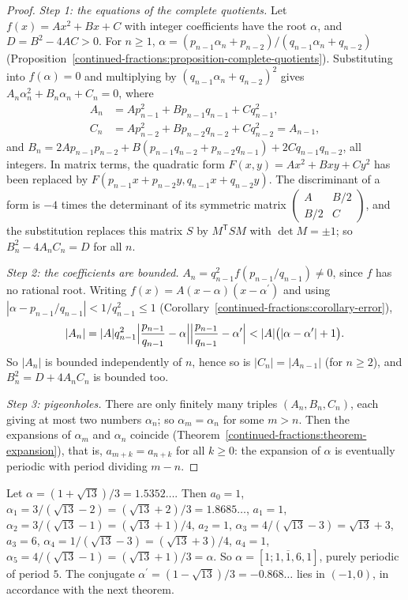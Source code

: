 \begin{proof}
\emph{Step 1: the equations of the complete quotients.} Let $f(x) = Ax^2 + Bx + C$ with integer coefficients have the root $\alpha$, and $D = B^2 - 4AC > 0$. For $n \geq 1$,
$\alpha = (p_{n-1}\alpha_n + p_{n-2})/(q_{n-1}\alpha_n + q_{n-2})$ (Proposition~\ref{continued-fractions:proposition-complete-quotients}). Substituting into $f(\alpha) = 0$ and multiplying by
$(q_{n-1}\alpha_n + q_{n-2})^2$ gives $A_n\alpha_n^2 + B_n\alpha_n + C_n = 0$, where
\[
\begin{aligned}
A_n &= Ap_{n-1}^2 + Bp_{n-1}q_{n-1} + Cq_{n-1}^2,\\
C_n &= Ap_{n-2}^2 + Bp_{n-2}q_{n-2} + Cq_{n-2}^2 = A_{n-1},
\end{aligned}
\]
and $B_n = 2Ap_{n-1}p_{n-2} + B(p_{n-1}q_{n-2} + p_{n-2}q_{n-1}) + 2Cq_{n-1}q_{n-2}$, all integers. In matrix terms, the quadratic form $F(x, y) = Ax^2 + Bxy + Cy^2$ has been replaced by
$F(p_{n-1}x + p_{n-2}y, q_{n-1}x + q_{n-2}y)$. The discriminant of a form is $-4$ times the determinant of its symmetric matrix $\begin{pmatrix} A & B/2\\ B/2 & C\end{pmatrix}$, and the substitution
replaces this matrix $S$ by $M^{\mathsf T}SM$ with $\det M = \pm 1$; so $B_n^2 - 4A_nC_n = D$ for all $n$.

\emph{Step 2: the coefficients are bounded.} $A_n = q_{n-1}^2f(p_{n-1}/q_{n-1}) \neq 0$, since $f$ has no rational root. Writing $f(x) = A(x - \alpha)(x - \alpha^{\prime})$ and using
$|\alpha - p_{n-1}/q_{n-1}| < 1/q_{n-1}^2 \leq 1$ (Corollary~\ref{continued-fractions:corollary-error}),
\[
|A_n| = |A|q_{n-1}^2\Bigl|\frac{p_{n-1}}{q_{n-1}} - \alpha\Bigr|\Bigl|\frac{p_{n-1}}{q_{n-1}} - \alpha^{\prime}\Bigr| < |A|\bigl(|\alpha - \alpha^{\prime}| + 1\bigr).
\]
So $|A_n|$ is bounded independently of $n$, hence so is $|C_n| = |A_{n-1}|$ (for $n \geq 2$), and $B_n^2 = D + 4A_nC_n$ is bounded too.

\emph{Step 3: pigeonholes.} There are only finitely many triples $(A_n, B_n, C_n)$, each giving at most two numbers $\alpha_n$; so $\alpha_m = \alpha_n$ for some $m > n$. Then the expansions of
$\alpha_m$ and $\alpha_n$ coincide (Theorem~\ref{continued-fractions:theorem-expansion}), that is, $a_{m+k} = a_{n+k}$ for all $k \geq 0$: the expansion of $\alpha$ is eventually periodic with
period dividing $m - n$.
\end{proof}

\begin{example}\label{continued-fractions:example-lagrange}
Let $\alpha = (1 + \sqrt{13})/3 = 1.5352\ldots$. Then $a_0 = 1$, $\alpha_1 = 3/(\sqrt{13} - 2) = (\sqrt{13} + 2)/3 = 1.8685\ldots$, $a_1 = 1$, $\alpha_2 = 3/(\sqrt{13} - 1) = (\sqrt{13} + 1)/4$,
$a_2 = 1$, $\alpha_3 = 4/(\sqrt{13} - 3) = \sqrt{13} + 3$, $a_3 = 6$, $\alpha_4 = 1/(\sqrt{13} - 3) = (\sqrt{13} + 3)/4$, $a_4 = 1$, $\alpha_5 = 4/(\sqrt{13} - 1) = (\sqrt{13} + 1)/3 = \alpha$.
So $\alpha = [\overline{1; 1, 1, 6, 1}]$, purely periodic of period $5$. The conjugate $\alpha^{\prime} = (1 - \sqrt{13})/3 = -0.868\ldots$ lies in $(-1, 0)$, in accordance with the next theorem.
\end{example}


